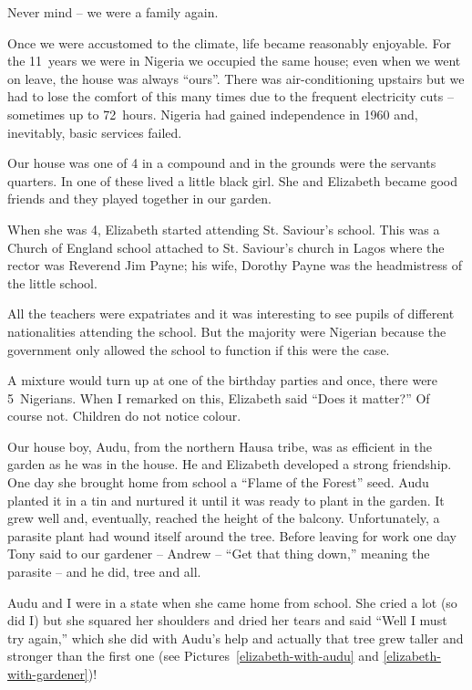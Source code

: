Never mind -- we were a family again.

Once we were accustomed to the climate, life became reasonably
enjoyable. For the 11~years we were in Nigeria we occupied the same
house; even when we went on leave, the house was always
``ours''. There was air-conditioning upstairs but we had to lose the
comfort of this many times due to the frequent electricity cuts --
sometimes up to 72~hours. Nigeria had gained independence in 1960 and,
inevitably, basic services failed.

Our house was one of 4 in a compound and in the grounds were the
servants quarters. In one of these lived a little black girl. She and
Elizabeth became good friends and they played together in our garden.

When she was 4, Elizabeth started attending St. Saviour's school. This
was a Church of England school attached to St. Saviour's church in
Lagos where the rector was Reverend Jim Payne; his wife, Dorothy Payne
was the headmistress of the little school.

All the teachers were expatriates and it was interesting to see pupils
of different nationalities attending the school. But the majority were
Nigerian because the government only allowed the school to function if
this were the case.

A mixture would turn up at one of the birthday parties and once, there
were 5~Nigerians. When I remarked on this, Elizabeth said ``Does it
matter?'' Of course not. Children do not notice colour.

Our house boy, Audu, from the northern Hausa tribe, was as efficient
in the garden as he was in the house. He and Elizabeth developed a
strong friendship. One day she brought home from school a ``Flame of
the Forest'' seed. Audu planted it in a tin and nurtured it until it
was ready to plant in the garden. It grew well and, eventually,
reached the height of the balcony. Unfortunately, a parasite plant had
wound itself around the tree. Before leaving for work one day Tony
said to our gardener -- Andrew -- ``Get that thing down,'' meaning the
parasite -- and he did, tree and all.

Audu and I were in a state when she came home from school. She cried a
lot (so did I) but she squared her shoulders and dried her tears and
said ``Well I must try again,'' which she did with Audu's help and
actually that tree grew taller and stronger than the first one (see
Pictures~\ref{elizabeth-with-audu} and \ref{elizabeth-with-gardener})!

